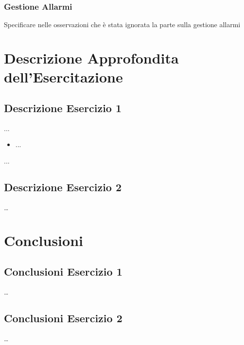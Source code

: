 \documentclass[a4paper]{article}
\begin{document}
\subsubsection{Gestione Allarmi}
Specificare nelle osservazioni che è stata ignorata la parte sulla gestione allarmi
\clearpage






\section{Descrizione Approfondita dell'Esercitazione}
\subsection{Descrizione Esercizio 1}
...
\begin{itemize}
\item ...
\end{itemize}
...

\subsection{Descrizione Esercizio 2}
\dots

\section{Conclusioni}
\subsection{Conclusioni Esercizio 1}
\dots
\subsection{Conclusioni Esercizio 2}
\dots
\end{document}
